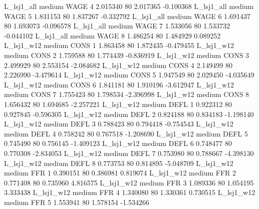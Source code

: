     L_lsj1_all     medium     WAGE                 4  2.015340 80       2.017365          -0.100368
    L_lsj1_all     medium     WAGE                 5  1.831153 80       1.837267          -0.332792
    L_lsj1_all     medium     WAGE                 6  1.691437 80       1.693073          -0.096578
    L_lsj1_all     medium     WAGE                 7  1.533056 80       1.533732          -0.044102
    L_lsj1_all     medium     WAGE                 8  1.486254 80       1.484929           0.089252
    L_lsj1_w12     medium     CONS                 1  1.863458 80       1.872435          -0.479455
    L_lsj1_w12     medium     CONS                 2  1.759588 80       1.774439          -0.836919
    L_lsj1_w12     medium     CONS                 3  2.499929 80       2.553154          -2.084682
    L_lsj1_w12     medium     CONS                 4  2.149499 80       2.226990          -3.479614
    L_lsj1_w12     medium     CONS                 5  1.947549 80       2.029450          -4.035649
    L_lsj1_w12     medium     CONS                 6  1.841181 80       1.910196          -3.612947
    L_lsj1_w12     medium     CONS                 7  1.755423 80       1.798534          -2.396998
    L_lsj1_w12     medium     CONS                 8  1.656432 80       1.694685          -2.257221
    L_lsj1_w12     medium     DEFL                 1  0.922312 80       0.927845          -0.596305
    L_lsj1_w12     medium     DEFL                 2  0.824188 80       0.834183          -1.198140
    L_lsj1_w12     medium     DEFL                 3  0.788423 80       0.794418          -0.754543
    L_lsj1_w12     medium     DEFL                 4  0.758242 80       0.767518          -1.208690
    L_lsj1_w12     medium     DEFL                 5  0.745490 80       0.756145          -1.409123
    L_lsj1_w12     medium     DEFL                 6  0.748477 80       0.770308          -2.834053
    L_lsj1_w12     medium     DEFL                 7  0.753980 80       0.788667          -4.398130
    L_lsj1_w12     medium     DEFL                 8  0.773753 80       0.814895          -5.048709
    L_lsj1_w12     medium      FFR                 1  0.390151 80       0.386981           0.819074
    L_lsj1_w12     medium      FFR                 2  0.771408 80       0.735960           4.816575
    L_lsj1_w12     medium      FFR                 3  1.089336 80       1.054195           3.333438
    L_lsj1_w12     medium      FFR                 4  1.340080 80       1.330361           0.730515
    L_lsj1_w12     medium      FFR                 5  1.553941 80       1.578154          -1.534266
